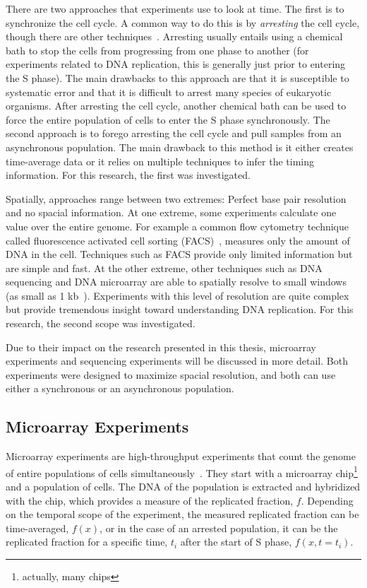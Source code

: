 	There are two approaches that experiments use to look at time.
	The first is to synchronize the cell cycle.
	A common way to do this is by \emph{arresting} the cell cycle, though there are other techniques~\cite{CellCycleSynch}.
	Arresting usually entails using a chemical bath to stop the cells from progressing from one phase to another (for experiments related to DNA replication, this is generally just prior to entering the S phase).
	The main drawbacks to this approach are that it is susceptible to systematic error and that it is difficult to arrest many species of eukaryotic organisms.
	After arresting the cell cycle, another chemical bath can be used to force the entire population of cells to enter the S phase synchronously.
	The second approach is to forego arresting the cell cycle and pull samples from an asynchronous population.
	The main drawback to this method is it either creates time-average data or it relies on multiple techniques to infer the timing information.
	For this research, the first was investigated.
	
	Spatially, approaches range between two extremes: Perfect base pair resolution and no spacial information.
	At one extreme, some experiments calculate one value over the entire genome. 
	For example a common flow cytometry technique called fluorescence activated cell sorting (FACS)~\cite{DeepSeq, SequencingReview}, measures only the amount of DNA in the cell.
	Techniques such as FACS provide only limited information but are simple and fast.
	At the other extreme, other techniques such as DNA sequencing and DNA microarray are able to spatially resolve to small windows (as small as 1 kb~\cite{DeepSeq}).
	Experiments with this level of resolution are quite complex but provide tremendous insight toward understanding DNA replication.
	For this research, the second scope was investigated.
	
	Due to their impact on the research presented in this thesis, microarray experiments and sequencing experiments will be discussed in more detail.
	Both experiments were designed to maximize spacial resolution, and both can use either a synchronous or an asynchronous population.
	
	
		\subsection{Microarray Experiments}
		\label{subsec:Microarray}
		
		Microarray experiments are high-throughput experiments that count the genome of entire populations of cells simultaneously~\cite{MicroarrayReview}.
		They start with a microarray chip\footnote{actually, many chips} and a population of cells.
		The DNA of the population is extracted and hybridized with the chip, which provides a measure of the replicated fraction, $f$.
		Depending on the temporal scope of the experiment, the measured replicated fraction can be time-averaged, $f(x)$, or in the case of an arrested population, it can be the replicated fraction for a specific time, $t_i$ after the start of S phase, $f(x,t=t_i)$.
		
